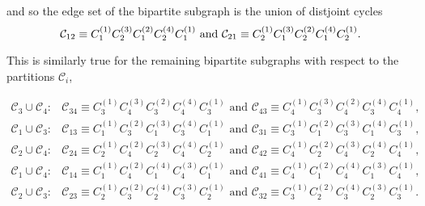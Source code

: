\documentclass[11pt]{article}
\begin{document}
and so the edge set of the bipartite subgraph is the union of distjoint
cycles%
\begin{equation}
\mathcal{C}_{12}\equiv C_{1}^{\left( 1\right) }C_{2}^{\left( 3\right)
}C_{1}^{\left( 2\right) }C_{2}^{\left( 4\right) }C_{1}^{\left( 1\right) }%
\text{ and }\mathcal{C}_{21}\equiv C_{2}^{\left( 1\right) }C_{1}^{\left(
3\right) }C_{2}^{\left( 2\right) }C_{1}^{\left( 4\right) }C_{2}^{\left(
1\right) }.  \notag
\end{equation}

This is similarly true for the remaining bipartite subgraphs with respect to
the partitions $\mathcal{C}_{i}$,

\begin{equation*}
\begin{array}{cc}
\mathcal{C}_{3}\cup \mathcal{C}_{4}: & \mathcal{C}_{34}\equiv C_{3}^{\left(
1\right) }C_{4}^{\left( 3\right) }C_{3}^{\left( 2\right) }C_{4}^{\left(
4\right) }C_{3}^{\left( 1\right) }\text{ and }\mathcal{C}_{43}\equiv
C_{4}^{\left( 1\right) }C_{3}^{\left( 3\right) }C_{4}^{\left( 2\right)
}C_{3}^{\left( 4\right) }C_{4}^{\left( 1\right) }, \\ 
\mathcal{C}_{1}\cup \mathcal{C}_{3}: & \mathcal{C}_{13}\equiv C_{1}^{\left(
1\right) }C_{3}^{\left( 2\right) }C_{1}^{\left( 3\right) }C_{3}^{\left(
4\right) }C_{1}^{\left( 1\right) }\text{ and }\mathcal{C}_{31}\equiv
C_{3}^{\left( 1\right) }C_{1}^{\left( 2\right) }C_{3}^{\left( 3\right)
}C_{1}^{\left( 4\right) }C_{3}^{\left( 1\right) }, \\ 
\mathcal{C}_{2}\cup \mathcal{C}_{4}: & \mathcal{C}_{24}\equiv C_{2}^{\left(
1\right) }C_{4}^{\left( 2\right) }C_{2}^{\left( 3\right) }C_{4}^{\left(
4\right) }C_{2}^{\left( 1\right) }\text{ and }\mathcal{C}_{42}\equiv
C_{4}^{\left( 1\right) }C_{2}^{\left( 2\right) }C_{4}^{\left( 3\right)
}C_{2}^{\left( 4\right) }C_{4}^{\left( 1\right) }, \\ 
\mathcal{C}_{1}\cup \mathcal{C}_{4}: & \mathcal{C}_{14}\equiv C_{1}^{\left(
1\right) }C_{4}^{\left( 2\right) }C_{1}^{\left( 4\right) }C_{4}^{\left(
3\right) }C_{1}^{\left( 1\right) }\text{ and }\mathcal{C}_{41}\equiv
C_{4}^{\left( 1\right) }C_{1}^{\left( 2\right) }C_{4}^{\left( 4\right)
}C_{1}^{\left( 3\right) }C_{4}^{\left( 1\right) }, \\ 
\mathcal{C}_{2}\cup \mathcal{C}_{3}: & \mathcal{C}_{23}\equiv C_{2}^{\left(
1\right) }C_{3}^{\left( 2\right) }C_{2}^{\left( 4\right) }C_{3}^{\left(
3\right) }C_{2}^{\left( 1\right) }\text{ and }\mathcal{C}_{32}\equiv
C_{3}^{\left( 1\right) }C_{2}^{\left( 2\right) }C_{3}^{\left( 4\right)
}C_{2}^{\left( 3\right) }C_{3}^{\left( 1\right) }.%
\end{array}%
\end{equation*}
\end{document}
